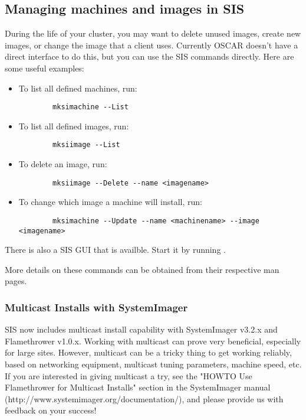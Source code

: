 %
%
%

\subsection{Managing machines and images in SIS}
\label{app:troubleshooting-machines-images}

During the life of your cluster, you may want to delete unused
images, create new images, or change the image that a
client uses.  Currently OSCAR doesn't have a direct interface to do
this, but you can use the SIS commands directly. Here are some useful
examples:

\begin{itemize}
\item To list all defined machines, run:
\begin{verbatim}
        mksimachine --List
\end{verbatim}
\item To list all defined images, run:
\begin{verbatim}
        mksiimage --List
\end{verbatim}
\item To delete an image, run:
\begin{verbatim}
        mksiimage --Delete --name <imagename>
\end{verbatim}
\item To change which image a machine will install, run:
\begin{verbatim}
        mksimachine --Update --name <machinename> --image <imagename>
\end{verbatim}
\end{itemize}

There is also a SIS GUI that is availble. Start it by running
. 

More details on these commands can be obtained from their respective
man pages.

\subsubsection{Multicast Installs with SystemImager}
SIS now includes multicast install capability with SystemImager v3.2.x
and Flamethrower v1.0.x.  Working with multicast can prove very
beneficial, especially for large sites.  However, multicast can be a
tricky thing to get working reliably, based on networking equipment,
multicast tuning parameters, machine speed, etc.  If you are interested
in giving multicast a try, see the "HOWTO Use Flamethrower for Multicast
Installs" section in the SystemImager manual (http://www.systemimager.org/documentation/), and please provide us with feedback on your success!


